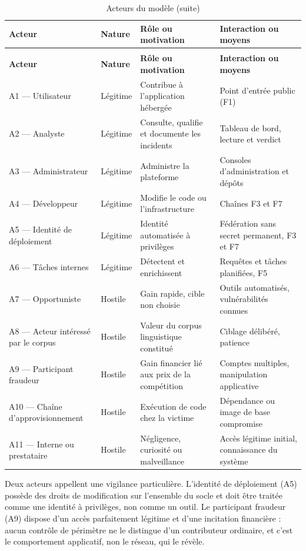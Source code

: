 {\footnotesize
\setlength{\tabcolsep}{3pt}
\begin{longtable}{|P{2.5cm}|P{1.3cm}|P{5.4cm}|P{5.85cm}|}
\caption[Acteurs du modèle, A1 à A11]{Acteurs du modèle : série unique, nature indiquée en colonne}
\label{tab:acteurs} \\
\hline
\textbf{Acteur} & \textbf{Nature} & \textbf{Rôle ou motivation} & \textbf{Interaction ou moyens} \\
\hline
\endfirsthead
\caption[]{Acteurs du modèle (suite)} \\
\hline
\textbf{Acteur} & \textbf{Nature} & \textbf{Rôle ou motivation} & \textbf{Interaction ou moyens} \\
\hline
\endhead
A1 — Utilisateur & Légitime & Contribue à l'application hébergée & Point d'entrée public (F1) \\ \hline
A2 — Analyste & Légitime & Consulte, qualifie et documente les incidents & Tableau de bord, lecture et verdict \\ \hline
A3 — Administrateur & Légitime & Administre la plateforme & Consoles d'administration et dépôts \\ \hline
A4 — Développeur & Légitime & Modifie le code ou l'infrastructure & Chaînes F3 et F7 \\ \hline
A5 — Identité de déploiement & Légitime & Identité automatisée à privilèges & Fédération sans secret permanent, F3 et F7 \\ \hline
A6 — Tâches internes & Légitime & Détectent et enrichissent & Requêtes et tâches planifiées, F5 \\ \hline
A7 — Opportuniste & Hostile & Gain rapide, cible non choisie & Outils automatisés, vulnérabilités connues \\ \hline
A8 — Acteur intéressé par le corpus & Hostile & Valeur du corpus linguistique constitué & Ciblage délibéré, patience \\ \hline
A9 — Participant fraudeur & Hostile & Gain financier lié aux prix de la compétition & Comptes multiples, manipulation applicative \\ \hline
A10 — Chaîne d'approvisionnement & Hostile & Exécution de code chez la victime & Dépendance ou image de base compromise \\ \hline
A11 — Interne ou prestataire & Hostile & Négligence, curiosité ou malveillance & Accès légitime initial, connaissance du système \\
\hline
\end{longtable}
}

Deux acteurs appellent une vigilance particulière. L'identité de déploiement (A5) possède des
droits de modification sur l'ensemble du socle et doit être traitée comme une identité à
privilèges, non comme un outil. Le participant fraudeur (A9) dispose d'un accès parfaitement
légitime et d'une incitation financière : aucun contrôle de périmètre ne le distingue d'un
contributeur ordinaire, et c'est le comportement applicatif, non le réseau, qui le révèle.

